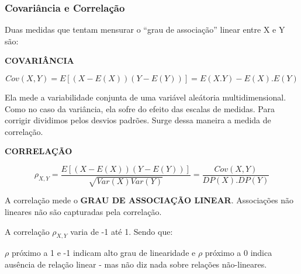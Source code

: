 \documentclass[
  letterpaper,
  DIV=11,
  numbers=noendperiod]{scrreprt}
\begin{document}
\subsubsection{Covariância e
Correlação}\label{covariuxe2ncia-e-correlauxe7uxe3o}

Duas medidas que tentam mensurar o ``grau de associação'' linear entre X
e Y são:

\textbf{COVARIÂNCIA}

\[Cov(X,Y)=E[(X-E(X))(Y-E(Y))]= E(X.Y)-E(X).E(Y)\]

Ela mede a variabilidade conjunta de uma variável aleátoria
multidimensional. Como no caso da variância, ela sofre do efeito das
escalas de medidas. Para corrigir dividimos pelos desvios padrões. Surge
dessa maneira a medida de correlação.

\textbf{CORRELAÇÃO}

\[\rho_{X,Y}=\frac{E[(X-E(X))(Y-E(Y))]}{\sqrt{Var(X)Var(Y)}}=\frac{Cov(X,Y)}{DP(X).DP(Y)}\]

\begin{tcolorbox}[enhanced jigsaw, leftrule=.75mm, coltitle=black, colframe=quarto-callout-warning-color-frame, toprule=.15mm, opacitybacktitle=0.6, bottomtitle=1mm, bottomrule=.15mm, titlerule=0mm, toptitle=1mm, title=\textcolor{quarto-callout-warning-color}{\faExclamationTriangle}\hspace{0.5em}{Correlação}, arc=.35mm, breakable, opacityback=0, colbacktitle=quarto-callout-warning-color!10!white, colback=white, left=2mm, rightrule=.15mm]

A correlação mede o \textbf{GRAU DE ASSOCIAÇÃO LINEAR}. Associações não
lineares não são capturadas pela correlação.

\end{tcolorbox}

\begin{tcolorbox}[enhanced jigsaw, leftrule=.75mm, coltitle=black, colframe=quarto-callout-note-color-frame, toprule=.15mm, opacitybacktitle=0.6, bottomtitle=1mm, bottomrule=.15mm, titlerule=0mm, toptitle=1mm, title=\textcolor{quarto-callout-note-color}{\faInfo}\hspace{0.5em}{Lendo a Correlação}, arc=.35mm, breakable, opacityback=0, colbacktitle=quarto-callout-note-color!10!white, colback=white, left=2mm, rightrule=.15mm]

A correlação \(\rho_{X,Y}\) varia de -1 até 1. Sendo que:

\(\rho\) próximo a 1 e -1 indicam alto grau de linearidade e \(\rho\)
próximo a 0 indica ausência de relação linear - mas não diz nada sobre
relações não-lineares.

\end{tcolorbox}
\end{document}
